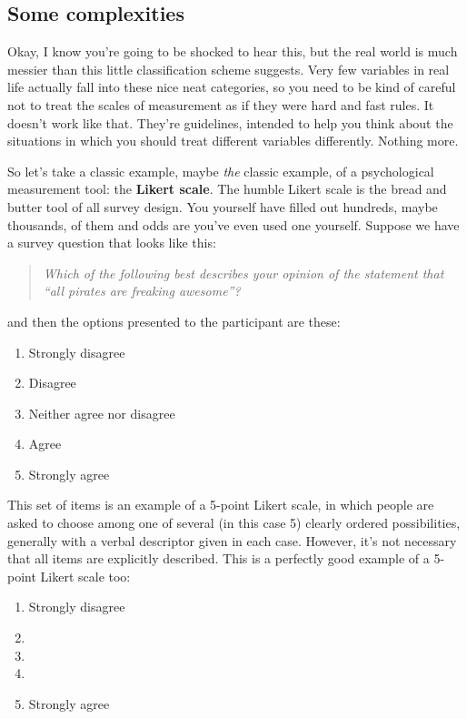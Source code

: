 \documentclass[
  a4paper,
]{book}
\providecommand{\tightlist}{%
  \setlength{\itemsep}{0pt}\setlength{\parskip}{0pt}}
\begin{document}
\subsection{Some complexities}\label{some-complexities}

Okay, I know you're going to be shocked to hear this, but the real world
is much messier than this little classification scheme suggests. Very
few variables in real life actually fall into these nice neat
categories, so you need to be kind of careful not to treat the scales of
measurement as if they were hard and fast rules. It doesn't work like
that. They're guidelines, intended to help you think about the
situations in which you should treat different variables differently.
Nothing more.

So let's take a classic example, maybe \emph{the} classic example, of a
psychological measurement tool: the \textbf{Likert scale}. The humble
Likert scale is the bread and butter tool of all survey design. You
yourself have filled out hundreds, maybe thousands, of them and odds are
you've even used one yourself. Suppose we have a survey question that
looks like this:

\begin{quote}
\emph{Which of the following best describes your opinion of the
statement that ``all pirates are freaking awesome''?}
\end{quote}

and then the options presented to the participant are these:

\begin{enumerate}
\def\labelenumi{\arabic{enumi}.}
\tightlist
\item
  Strongly disagree
\item
  Disagree
\item
  Neither agree nor disagree
\item
  Agree
\item
  Strongly agree
\end{enumerate}

This set of items is an example of a 5-point Likert scale, in which
people are asked to choose among one of several (in this case 5) clearly
ordered possibilities, generally with a verbal descriptor given in each
case. However, it's not necessary that all items are explicitly
described. This is a perfectly good example of a 5-point Likert scale
too:

\begin{enumerate}
\def\labelenumi{\arabic{enumi}.}
\tightlist
\item
  Strongly disagree
\item
\item
\item
\item
  Strongly agree
\end{enumerate}
\end{document}
